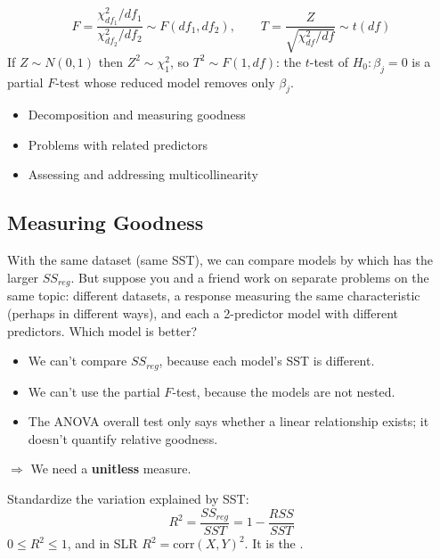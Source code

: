\begin{proposition}
    \[F=\frac{\chi^2_{df_1}/df_1}{\chi^2_{df_2}/df_2}\sim F(df_1,df_2),\qquad
    T=\frac{Z}{\sqrt{\chi^2_{df}/df}}\sim t(df)\]
    If $Z\sim N(0,1)$ then $Z^2\sim\chi^2_1$, so $T^2\sim F(1,df)$: the $t$-test of
    $H_0:\beta_j=0$ is a partial $F$-test whose reduced model removes only $\beta_j$.
\end{proposition}

\begin{itemize}
    \item Decomposition and measuring goodness
    \item Problems with related predictors
    \item Assessing and addressing multicollinearity
\end{itemize}

\subsection{Measuring Goodness}

\begin{remark}
    With the same dataset (same SST), we can compare models by which has the larger
    $SS_{reg}$. But suppose you and a friend work on separate problems on the same topic:
    different datasets, a response measuring the same characteristic (perhaps in different
    ways), and each a 2-predictor model with different predictors. Which model is better?
    \begin{itemize}
        \item We can't compare $SS_{reg}$, because each model's SST is different.
        \item We can't use the partial $F$-test, because the models are not nested.
        \item The ANOVA overall test only says whether a linear relationship exists; it doesn't
        quantify relative goodness.
    \end{itemize}
    $\Rightarrow$ We need a \textbf{unitless} measure.
\end{remark}

\begin{definition}
    Standardize the variation explained by SST:
    \[\boxed{R^2=\frac{SS_{reg}}{SST}=1-\frac{RSS}{SST}}\]
     $0\leq R^2\leq1$, and in SLR
    $R^2=\mathrm{corr}(X,Y)^2$. It is the .
\end{definition}


